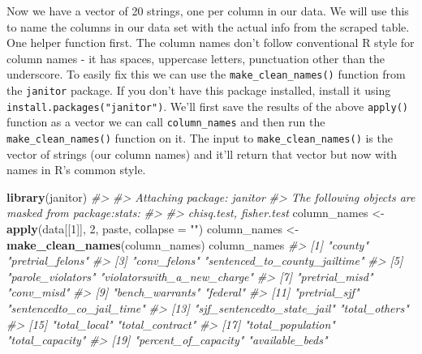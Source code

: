 \documentclass[
  12pt,
]{book}
\newenvironment{Shaded}{\begin{snugshade}}{\end{snugshade}}
\newcommand{\CommentTok}[1]{\textcolor[rgb]{0.37,0.37,0.37}{\textit{#1}}}
\newcommand{\DataTypeTok}[1]{\textcolor[rgb]{0.27,0.27,0.27}{#1}}
\newcommand{\DecValTok}[1]{\textcolor[rgb]{0.06,0.06,0.06}{#1}}
\newcommand{\KeywordTok}[1]{\textcolor[rgb]{0.27,0.27,0.27}{\textbf{#1}}}
\newcommand{\NormalTok}[1]{#1}
\newcommand{\StringTok}[1]{\textcolor[rgb]{0.5,0.5,0.5}{#1}}
\begin{document}
Now we have a vector of 20 strings, one per column in our data. We will use this to name the columns in our data set with the actual info from the scraped table. One helper function first. The column names don't follow conventional R style for column names - it has spaces, uppercase letters, punctuation other than the underscore. To easily fix this we can use the \texttt{make\_clean\_names()} function from the \texttt{janitor} package. If you don't have this package installed, install it using \texttt{install.packages("janitor")}. We'll first save the results of the above \texttt{apply()} function as a vector we can call \texttt{column\_names} and then run the \texttt{make\_clean\_names()} function on it. The input to \texttt{make\_clean\_names()} is the vector of strings (our column names) and it'll return that vector but now with names in R's common style.

\begin{Shaded}
\begin{Highlighting}[]
\KeywordTok{library}\NormalTok{(janitor)}
\CommentTok{\#> }
\CommentTok{\#> Attaching package: \textquotesingle{}janitor\textquotesingle{}}
\CommentTok{\#> The following objects are masked from \textquotesingle{}package:stats\textquotesingle{}:}
\CommentTok{\#> }
\CommentTok{\#>     chisq.test, fisher.test}
\NormalTok{column\_names <{-}}\StringTok{ }\KeywordTok{apply}\NormalTok{(data[[}\DecValTok{1}\NormalTok{]], }\DecValTok{2}\NormalTok{, paste, }\DataTypeTok{collapse =} \StringTok{""}\NormalTok{)}
\NormalTok{column\_names <{-}}\StringTok{ }\KeywordTok{make\_clean\_names}\NormalTok{(column\_names)}
\NormalTok{column\_names}
\CommentTok{\#>  [1] "county"                       "pretrial\_felons"             }
\CommentTok{\#>  [3] "conv\_felons"                  "sentenced\_to\_county\_jailtime"}
\CommentTok{\#>  [5] "parole\_violators"             "violatorswith\_a\_new\_charge"  }
\CommentTok{\#>  [7] "pretrial\_misd"                "conv\_misd"                   }
\CommentTok{\#>  [9] "bench\_warrants"               "federal"                     }
\CommentTok{\#> [11] "pretrial\_sjf"                 "sentencedto\_co\_jail\_time"    }
\CommentTok{\#> [13] "sjf\_sentencedto\_state\_jail"   "total\_others"                }
\CommentTok{\#> [15] "total\_local"                  "total\_contract"              }
\CommentTok{\#> [17] "total\_population"             "total\_capacity"              }
\CommentTok{\#> [19] "percent\_of\_capacity"          "available\_beds"}
\end{Highlighting}
\end{Shaded}
\end{document}
